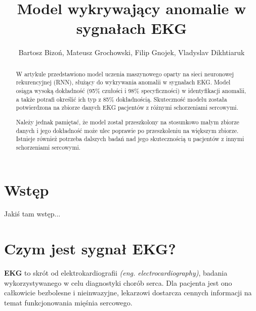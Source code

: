 \documentclass[12pt]{article}
\title{Model wykrywający anomalie w sygnałach EKG }
\author{Bartosz Bizoń, Mateusz Grochowski, Filip Gnojek, Vladyslav Dikhtiaruk}
\begin{document}
\maketitle

\begin{abstract}
W artykule przedstawiono model uczenia maszynowego oparty na sieci neuronowej rekurencyjnej (RNN), służący do wykrywania anomalii w sygnałach EKG. Model osiąga wysoką dokładność (95\% czułości i 98\% specyficzności) w identyfikacji anomalii, a także potrafi określić ich typ z 85\% dokładnością. Skuteczność modelu została potwierdzona na zbiorze danych EKG pacjentów z różnymi schorzeniami sercowymi.

Należy jednak pamiętać, że model został przeszkolony na stosunkowo małym zbiorze danych i jego dokładność może ulec poprawie po przeszkoleniu na większym zbiorze. Istnieje również potrzeba dalszych badań nad jego skutecznością u pacjentów z innymi schorzeniami sercowymi.
\end{abstract}

\newpage
\tableofcontents

\newpage
\section{Wstęp}

Jakiś tam wstęp...

\section{Czym jest sygnał EKG?}
\textbf{EKG} to skrót od elektrokardiografii \textit{(eng. electrocardiography)}, badania wykorzystywanego w celu diagnostyki chorób serca. Dla pacjenta jest ono całkowicie bezbolesne i nieinwazyjne, lekarzowi dostarcza cennych informacji na temat funkcjonowania mięśnia sercowego.
\end{document}
